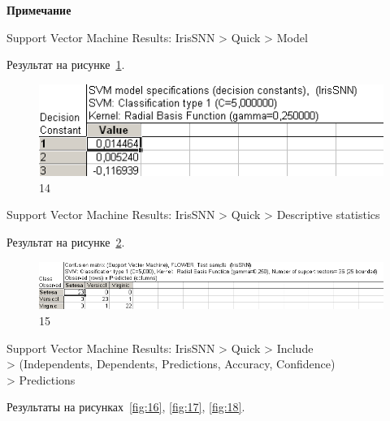 \newpage

\begin{center}
  \textbf{Примечание}
\end{center}

Support Vector Machine Results: IrisSNN > Quick > Model

Результат на рисунке~\ref{fig:14}.

\begin{figure}[!h]
  \centering

  \includegraphics[height=3cm]
  {inc/ex_14.PNG}

  \caption{14}

  \label{fig:14}
\end{figure}

Support Vector Machine Results: IrisSNN > Quick > Descriptive statistics

Результат на рисунке~\ref{fig:15}.

\begin{figure}[!h]
  \centering

  \includegraphics[width=18cm]
  {inc/ex_15.PNG}

  \caption{15}

  \label{fig:15}
\end{figure}

Support Vector Machine Results: IrisSNN > Quick > Include \\
> (Independents, Dependents, Predictions, Accuracy, Confidence) \\
> Predictions

Результаты на рисунках~\ref{fig:16}, \ref{fig:17}, \ref{fig:18}.


